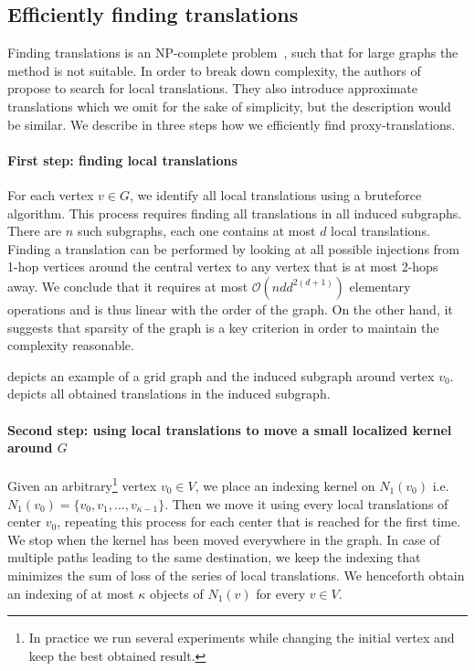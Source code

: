 \subsection{Efficiently finding translations}
Finding translations is an NP-complete problem~\cite{pasdeloup2017translations}, such that for large graphs the method is not suitable. 
In order to break down complexity, the authors of~\cite{pasdeloup2017convolutional} propose to search for local translations. They also introduce approximate translations which we omit for the sake of simplicity, but the description would be similar. We describe in three steps how we efficiently find proxy-translations.

\paragraph{First step: finding local translations}

For each vertex $v \in G$, we identify all local translations using a bruteforce algorithm. This process requires finding all translations in all induced subgraphs. There are $n$ such subgraphs, each one contains at most $d$ local translations. Finding a translation can be performed by looking at all possible injections from 1-hop vertices around the central vertex to any vertex that is at most 2-hops away. We conclude that it requires at most $\mathcal{O}(nd d^{2(d+1)})$ elementary operations and is thus linear with the order of the graph. On the other hand, it suggests that sparsity of the graph is a key criterion in order to maintain the complexity reasonable.

 depicts an example of a grid graph and the induced subgraph around vertex $v_0$.  depicts all obtained translations in the induced subgraph.




\paragraph{Second step: using local translations to move a small localized kernel around $G$}

Given an arbitrary\footnote{In practice we run several experiments while changing the initial vertex and keep the best obtained result.} vertex $v_0 \in V$, we place an indexing kernel on $N_1(v_0)$ i.e. $N_1(v_0) = \{v_0, v_1, ..., v_{\kappa-1}\}$. Then we move it using every local translations of center $v_0$, repeating this process for each center that is reached for the first time. We stop when the kernel has been moved everywhere in the graph. In case of multiple paths leading to the same destination, we keep the indexing that minimizes the sum of loss of the series of local translations. We henceforth obtain an indexing of at most $\kappa$ objects of $N_1(v)$ for every $v \in V$.

